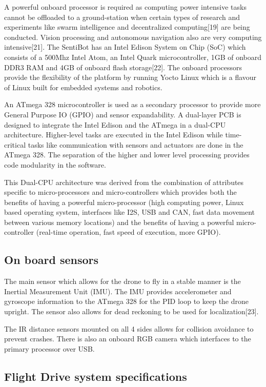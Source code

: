 \documentclass[12pt]{article}
\begin{document}
A powerful onboard processor is required as computing power intensive tasks cannot be offloaded to a ground-station when certain types of research and experiments like swarm intelligence and decentralized computing[19] are being conducted. Vision processing and autonomous navigation also are very computing intensive[21]. The SentiBot has an Intel Edison System on Chip (SoC) which consists of a 500Mhz Intel Atom, an Intel Quark microcontroller, 1GB of onboard DDR3 RAM and 4GB of onboard flash storage[22]. The onboard processors provide the flexibility of the platform by running Yocto Linux which is a flavour of Linux built for embedded systems and robotics. 

An ATmega 328 microcontroller is used as a secondary processor to provide more General Purpose IO (GPIO) and sensor expandability. A dual-layer PCB is designed to integrate the Intel Edison and the ATmega in a dual-CPU architecture. Higher-level tasks are executed in the Intel Edison while time-critical tasks like communication with sensors and actuators are done in the ATmega 328. The separation of the higher and lower level processing provides code modularity in the software.

This Dual-CPU architecture was derived from the combination of attributes specific to micro-processors and micro-controllers which provides both the benefits of having a powerful micro-processor (high computing power, Linux based operating system, interfaces like I2S, USB and CAN, fast data movement between various memory locations) and the benefits of having a powerful micro-controller (real-time operation, fast speed of execution, more GPIO). 

\subsection{On board sensors}

The main sensor which allows for the drone to fly in a stable manner is the Inertial Measurement Unit (IMU). The IMU provides accelerometer and gyroscope information to the ATmega 328 for the PID loop to keep the drone upright. The sensor also allows for dead reckoning to be used for localization[23].

The IR distance sensors mounted on all 4 sides allows for collision avoidance to prevent crashes. There is also an onboard RGB camera which interfaces to the primary processor over USB. 

\subsection{Flight Drive system specifications}
\end{document}

